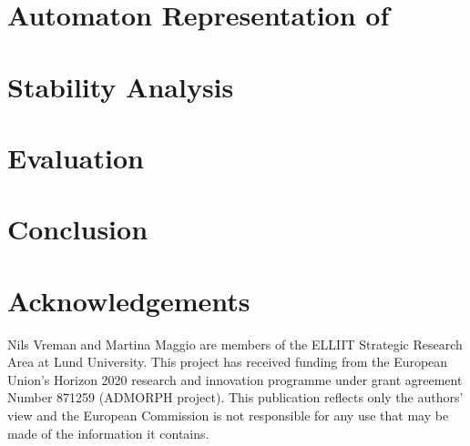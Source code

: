 \section{Automaton Representation of \ewhc{}}
\label{sec:state-machine}


\section{Stability Analysis}
\label{sec:stability}


\section{Evaluation}
\label{sec:evaluation}


\section{Conclusion}
\label{sec:conclusion}


\section*{Acknowledgements}
Nils Vreman and Martina Maggio are members of the ELLIIT Strategic Research Area at Lund University.
This project has received funding from the European Union's Horizon 2020 research and innovation programme under grant agreement Number 871259 (ADMORPH project).
This publication reflects only the authors' view and the European Commission is not responsible for any use that may be made of the information it contains.



\printbibliography[heading=subbibliography]
